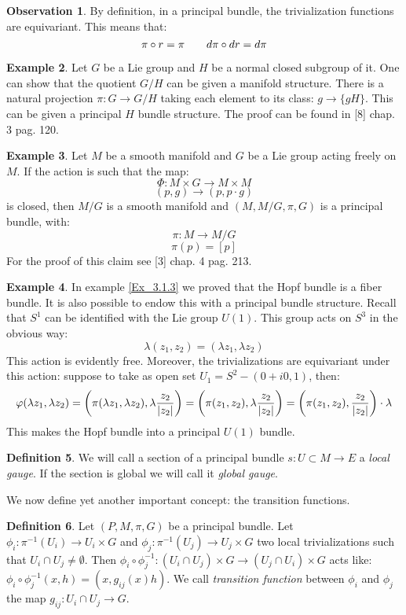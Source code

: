 \documentclass[12pt,a4paper]{report}
\theoremstyle{definition}
\newtheorem{Def}{Definition}[chapter]
\theoremstyle{Theorem}
\theoremstyle{definition}
\newtheorem{Ex}[Def]{Example}
\theoremstyle{definition}
\newtheorem{Obs}[Def]{Observation}
\begin{document}
	\begin{Obs} \label{Obs_3.5.1}
		By definition, in a principal bundle, the trivialization functions are equivariant. This means that:
		$$\pi\circ r=\pi\hspace{20 pt}d\pi\circ dr=d\pi$$
	\end{Obs}
	\begin{Ex}
		Let $G$ be a Lie group and $H$ be a normal closed subgroup of it. One can show that the quotient $G/H$ can be given a manifold structure.
		There is a natural projection $\pi:G\rightarrow G/H$ taking each element to its class: $g\rightarrow \{gH\}$. This can be given a principal $H$ bundle structure. The proof can be found in [8] chap. 3 pag. 120.
	\end{Ex}
	\begin{Ex}
		Let $M$ be a smooth manifold and $G$ be a Lie group acting freely on $M$. If the action is such that the map:
		$$\Phi:M\times G\rightarrow M\times M$$
		$$(p,g)\rightarrow(p,p\cdot g)$$
		is closed, then $M/G$ is a smooth manifold and $(M,M/G,\pi,G)$ is a principal bundle, with:
		$$\pi:M\rightarrow M/ G$$
		$$\pi(p)=[p]$$
		For the proof of this claim see [3] chap. 4 pag. 213.
	\end{Ex}
	\begin{Ex}\label{Ex_3.7.3}
		In example \ref{Ex_3.1.3} we proved that the Hopf bundle is a fiber bundle. It is also possible to endow this with a principal bundle structure. Recall that $S^1$ can be identified with the Lie group $U(1)$. This group acts on $S^3$ in the obvious way:
		$$\lambda(z_1,z_2)=(\lambda z_1,\lambda z_2)$$
		This action is evidently free. Moreover, the trivializations are equivariant under this action: suppose to take as open set $U_1=S^2-(0+i0,1)$, then:
		$$\varphi(\lambda z_1,\lambda z_2)=\bigg(\pi(\lambda z_1,\lambda
		z_2),\lambda{z_2\over |z_2|}\bigg)=\bigg(\pi(z_1,	z_2),\lambda{z_2\over |z_2|}\bigg)=\bigg(\pi(z_1,	z_2),{z_2\over |z_2|}\bigg)\cdot \lambda$$
		This makes the Hopf bundle into a principal $U(1)$ bundle.
	\end{Ex}
	\begin{Def}\label{Def_gauge}
		We will call a section of a principal bundle $s:U\subset M\rightarrow E$ a \textit{local gauge}. If the section is global we will call it \textit{global gauge}.
	\end{Def}
	We now define yet another important concept: the transition functions.
	\begin{Def}
		Let $(P,M,\pi,G)$ be a principal bundle. Let $\phi_i:\pi^{-1}(U_i)\rightarrow U_i\times G$ and $\phi_j:\pi^{-1}(U_j)\rightarrow U_j\times G$ two local trivializations such that $U_i\cap U_j\neq\emptyset$. Then $\phi_i\circ\phi^{-1}_j:(U_i\cap U_j)\times G\rightarrow (U_j\cap U_i)\times G$ acts like: $\phi_i\circ\phi^{-1}_j(x,h)=(x,g_{ij}(x)h)$. We call \textit{transition function} between $\phi_i$ and $\phi_j$ the map $g_{ij}:U_i\cap U_j\rightarrow G$. 
	\end{Def}
\end{document}
